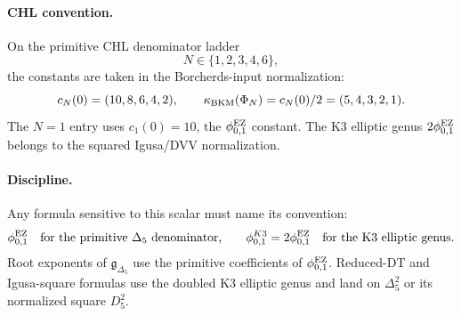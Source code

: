 \paragraph{CHL convention.}
On the primitive CHL denominator ladder
\[
  N\in\{1,2,3,4,6\},
\]
the constants are taken in the Borcherds-input normalization:
\[
  c_N(0)=(10,8,6,4,2),
  \qquad
  \kappa_{\mathrm{BKM}}(\Phi_N)=c_N(0)/2=(5,4,3,2,1).
\]
The \(N=1\) entry uses \(c_1(0)=10\), the
\(\phi_{0,1}^{\mathrm{EZ}}\) constant. The K3 elliptic genus \(2\phi_{0,1}^{\mathrm{EZ}}\)
belongs to the squared Igusa/DVV normalization.

\paragraph{Discipline.}
Any formula sensitive to this scalar must name its convention:
\[
  \phi_{0,1}^{\mathrm{EZ}}
  \quad\hbox{for the primitive \(\Delta_5\) denominator,}
  \qquad
  \phi_{0,1}^{K3}=2\phi_{0,1}^{\mathrm{EZ}}
  \quad\hbox{for the K3 elliptic genus.}
\]
Root exponents of \(\mathfrak g_{\Delta_5}\) use the primitive
coefficients of \(\phi_{0,1}^{\mathrm{EZ}}\). Reduced-DT and Igusa-square
formulas use the doubled K3 elliptic genus and land on
\(\Delta_5^2\) or its normalized square \(D_5^2\).
